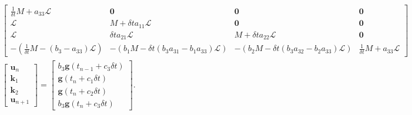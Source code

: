 \documentclass[a4paper,10pt]{article}
\begin{document}
{\small
\begin{align*}
\begin{bmatrix} \tfrac{1}{\delta t}M + a_{33}\mathcal{L} & \mathbf{0}  & \mathbf{0} & \mathbf{0}  \\
	\mathcal{L} & M + \delta ta_{11}\mathcal{L} & \mathbf{0} & \mathbf{0} \\
	\mathcal{L} & \delta t a_{21}\mathcal{L} & M + \delta ta_{22}\mathcal{L} & \mathbf{0} \\
	-\left(\tfrac{1}{\delta t}M - (b_3-a_{33})\mathcal{L}\right) & -\left(b_1M  - \delta t(b_3 a_{31} - b_1a_{33}) \mathcal{L}\right) &
	-\left(b_2M  - \delta t(b_3 a_{32} - b_2a_{33}) \mathcal{L}\right) & \tfrac{1}{\delta t}M + a_{33}\mathcal{L}  \end{bmatrix}
	\\
	\begin{bmatrix} \mathbf{u}_n \\ \mathbf{k}_1 \\ \mathbf{k}_2 \\ \mathbf{u}_{n+1} \end{bmatrix} =
	\begin{bmatrix} b_3\mathbf{g}(t_{n-1}+c_3\delta t) \\ \mathbf{g}(t_{n}+c_1\delta t) \\ \mathbf{g}(t_{n}+c_2\delta t) \\ b_3\mathbf{g}(t_{n}+c_3\delta t) \end{bmatrix}.
\end{align*}}
%
\end{document}
